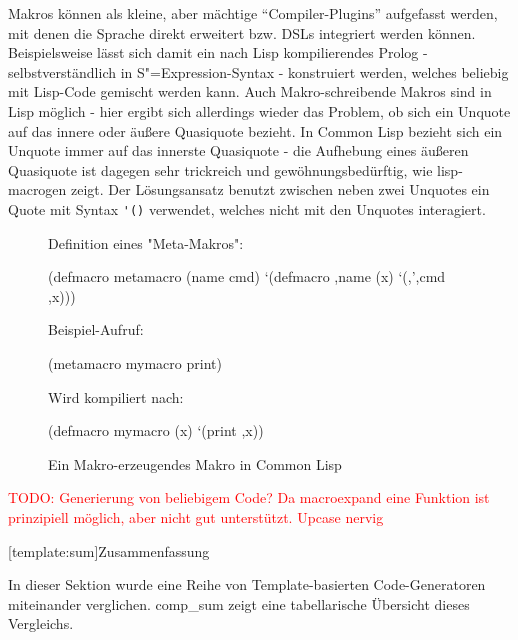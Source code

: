 \documentclass[11pt, a4paper, bibgerm]{book}
\newcommand\icode[1]{\lstinline?#1?}
\newcommand{\todo}[1]{
  \textcolor{red}{TODO: #1}
}
\newcommand\lsection{}
\newcommand\abb{}
\newcommand{\sexp}{S"=Expression}
\begin{document}
Makros können als kleine, aber mächtige "`Compiler-Plugins"' aufgefasst
werden, mit denen die Sprache direkt erweitert bzw. DSLs integriert
werden können. Beispielsweise lässt sich damit ein nach Lisp
kompilierendes Prolog\cite{NorvigProlog} - selbstverständlich in
\sexp{}-Syntax - konstruiert werden, welches beliebig mit Lisp-Code
gemischt werden kann. Auch Makro-schreibende Makros sind in Lisp möglich
- hier ergibt sich allerdings wieder das Problem, ob sich ein Unquote
auf das innere oder äußere Quasiquote bezieht. In Common Lisp bezieht
sich ein Unquote immer auf das innerste Quasiquote - die Aufhebung eines
äußeren Quasiquote ist dagegen sehr trickreich und gewöhnungsbedürftig,
wie \abb{lisp-macrogen} zeigt. Der Lösungsansatz benutzt zwischen neben
zwei Unquotes ein Quote mit Syntax \icode{'()} verwendet, welches nicht
mit den Unquotes interagiert.

\begin{figure}
  \centering
  \begin{code}
Definition eines "Meta-Makros":

(defmacro metamacro (name cmd)
  `(defmacro ,name (x)
     `(,',cmd ,x)))    

Beispiel-Aufruf:

(metamacro mymacro print)

Wird kompiliert nach:

(defmacro mymacro (x)
  `(print ,x))
  \end{code}
  \caption{Ein Makro-erzeugendes Makro in Common Lisp}
  \label{magicl:fig:lisp-macrogen}
\end{figure}

\todo{Generierung von beliebigem Code? Da macroexpand eine Funktion ist
  prinzipiell möglich, aber nicht gut unterstützt. Upcase nervig}

\lsection[template:sum]{Zusammenfassung}

In dieser Sektion wurde eine Reihe von Template-basierten
Code-Generatoren miteinander verglichen. \abb{comp_sum} zeigt eine
tabellarische Übersicht dieses Vergleichs. 
\end{document}
